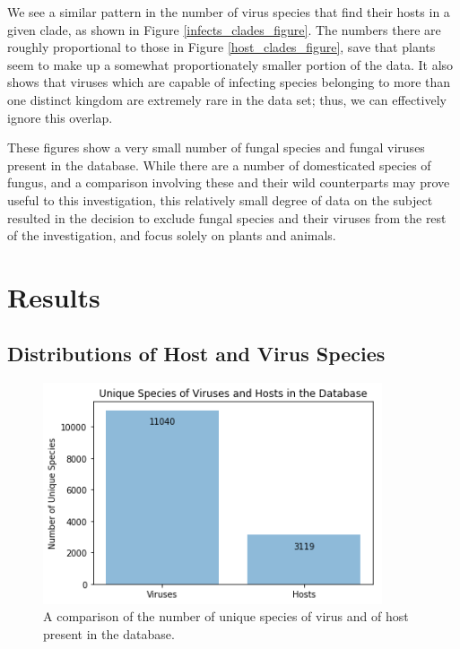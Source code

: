 \documentclass[12pt]{article}
\begin{document}
    

    We see a similar pattern in the number of virus species that find their
    hosts in a given clade, as shown in Figure \ref{infects_clades_figure}.
    The numbers there are roughly proportional to those in Figure
    \ref{host_clades_figure}, save that plants seem to make up a somewhat
    proportionately smaller portion of the data. It also shows that viruses
    which are capable of infecting species belonging to more than one distinct
    kingdom are extremely rare in the data set; thus, we can effectively ignore
    this overlap.

    These figures show a very small number of fungal species and fungal viruses
    present in the database. While there are a number of domesticated species of
    fungus, and a comparison involving these and their wild counterparts may
    prove useful to this investigation, this relatively small degree of data
    on the subject resulted in the decision to exclude fungal species and their
    viruses from the rest of the investigation, and focus solely on plants and
    animals.


    \section{Results}
    
    \subsection{Distributions of Host and Virus Species}

    \begin{figure}[H]
        \begin{center}
            \includegraphics[width=100mm]{unique_species_figure.png}
            \caption{A comparison of the number of unique species of virus and of
            host present in the database.}
            \label{unique_species_figure}
        \end{center}
    \end{figure}
\end{document}
